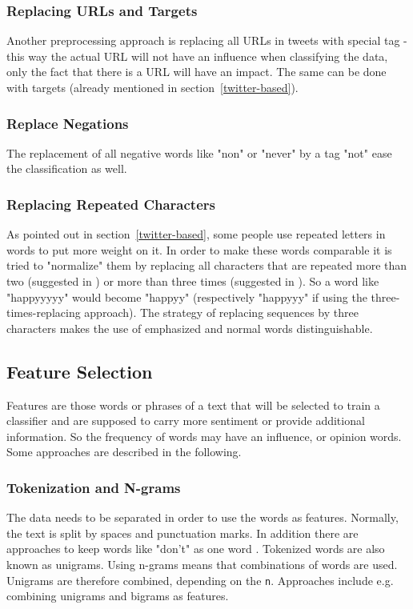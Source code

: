 \documentclass{acm_proc_article-sp}
\begin{document}
\subsubsection{Replacing URLs and Targets}
Another preprocessing approach is replacing all URLs in tweets with special tag - this way the actual URL will not have an influence when classifying the data, only the fact that there is a URL will have an impact.
The same can be done with targets (already mentioned in section~\ref{twitter-based}).

\subsubsection{Replace Negations}
The replacement of all negative words like "non" or "never" by a tag "not" ease the classification as well.

\subsubsection{Replacing Repeated Characters}
As pointed out in section~\ref{twitter-based}, some people use repeated letters in words to put more weight on it. In order to make these words comparable it is tried to "normalize" them by replacing all characters that are repeated more than two (suggested in \cite{go2009twitter}) or more than three times (suggested in \cite{agarwal2011sentiment}). So a word like "happyyyyy" would become "happyy" (respectively "happyyy" if using the three-times-replacing approach). The strategy of replacing sequences by three characters makes the use of emphasized and normal words distinguishable.

\subsection{Feature Selection}
Features are those words or phrases of a text that will be selected to train a classifier and are  supposed to carry more sentiment or provide additional information. So the frequency of words may have an influence, or opinion words. Some approaches are described in the following.

\subsubsection{Tokenization and N-grams}
The data needs to be separated in order to use the words as features. Normally, the text is split by spaces and punctuation marks. In addition there are approaches to keep words like "don't" as one word \cite{pak2010twitter}. Tokenized words are also known as unigrams.
Using n-grams means that combinations of words are used. Unigrams are therefore combined, depending on the \texttt{n}. Approaches include e.g. combining unigrams and bigrams as features. 
\cite{liu2010sentimentanalysis, go2009twitter}
\end{document}
